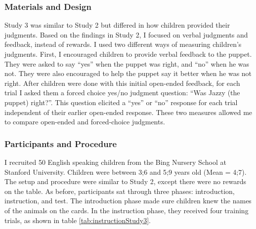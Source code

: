 \documentclass[oneside]{report}
\theoremstyle{definition}
\theoremstyle{definition}
\theoremstyle{definition}
\theoremstyle{remark}
\begin{document}
\subsubsection{Materials and Design}\label{materials-and-design-2}

Study 3 was similar to Study 2 but differed in how children provided
their judgments. Based on the findings in Study 2, I focused on verbal
judgments and feedback, instead of rewards. I used two different ways of
measuring children's judgments. First, I encouraged children to provide
verbal feedback to the puppet. They were asked to say ``yes'' when the
puppet was right, and ``no'' when he was not. They were also encouraged
to help the puppet say it better when he was not right. After children
were done with this initial open-ended feedback, for each trial I asked
them a forced choice yes/no judgment question: ``Was Jazzy (the puppet)
right?''. This question elicited a ``yes'' or ``no'' response for each
trial independent of their earlier open-ended response. These two
measures allowed me to compare open-ended and forced-choice judgments.

\subsubsection{Participants and
Procedure}\label{participants-and-procedure-2}

I recruited 50 English speaking children from the Bing Nursery School at
Stanford University. Children were between 3;6 and 5;9 years old (Mean =
4;7). The setup and procedure were similar to Study 2, except there were
no rewards on the table. As before, participants sat through three
phases: introduction, instruction, and test. The introduction phase made
sure children knew the names of the animals on the cards. In the
instruction phase, they received four training trials, as shown in table
\ref{tab:instructionStudy3}.
\end{document}
